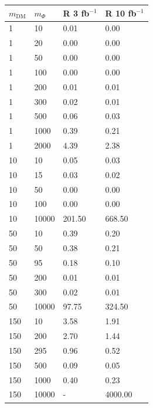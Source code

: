 \begin{table}[h!]
\small
\centering
\begin{minipage}{.45\textwidth}{
\begin{tabular}{llll}
\hline                      
 $m_\textrm{DM}$ & $m_\Phi$  & R 3 fb$^{-1}$ & R 10 fb$^{-1}$ \\ \hline

1  &       10  &      0.01  &    0.00 \\\hline
1  &       20  &      0.00  &    0.00 \\\hline
1  &       50  &      0.00  &    0.00 \\\hline
1  &       100  &     0.00  &    0.00 \\\hline
1  &       200  &     0.01  &    0.01 \\\hline
1  &       300  &     0.02  &    0.01 \\\hline
1  &       500  &     0.06  &    0.03 \\\hline
1  &       1000  &    0.39  &    0.21 \\\hline
1  &       2000  &    4.39  &    2.38 \\\hline
10  &      10  &      0.05  &    0.03 \\\hline
10  &      15  &      0.03  &    0.02 \\\hline
10  &      50  &      0.00  &    0.00 \\\hline
10  &      100  &     0.00  &    0.00 \\\hline
10  &      10000  &   201.50  &  668.50 \\\hline
50  &      10  &      0.39  &    0.20 \\\hline
50  &      50  &      0.38  &    0.21 \\\hline
50  &      95  &      0.18  &    0.10 \\\hline
50  &      200  &     0.01  &    0.01 \\\hline
50  &      300  &     0.02  &    0.01 \\\hline
50  &      10000  &   97.75  &   324.50 \\\hline
150  &     10  &      3.58  &    1.91 \\\hline
150  &     200  &     2.70  &    1.44 \\\hline
150  &     295  &     0.96  &    0.52 \\\hline
150  &     500  &     0.09  &    0.05 \\\hline
150  &     1000  &    0.40  &    0.23 \\\hline
150  &     10000  &   -     &  4000.00   \\ \hline

\end{tabular}}
\end{minipage}
\end{table}
